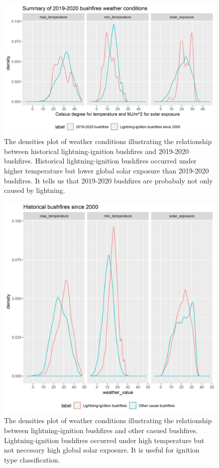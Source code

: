 \documentclass{monashthesis}
\begin{document}
\begin{figure}
\centering
\includegraphics[width=5.20833in]{figures/history_weather_condition.jpg}
\caption{The densities plot of weather conditions illustrating the
relationship between historical lightning-ignition bushfires and
2019-2020 bushfires. Historical lightning-ignition bushfires occurred
under higher temperature but lower global solar exposure than 2019-2020
bushfires. It tells us that 2019-2020 bushfires are probabaly not only
caused by lightning.}
\end{figure}

\begin{figure}
\centering
\includegraphics[width=5.20833in]{figures/his_lightning.jpg}
\caption{The densities plot of weather conditions illustrating the
relationship between lightning-ignition bushfires and other casued
bushfires. Lightning-ignition bushfires occurred under high temperature
but not neccssary high global solar exposure. It is useful for ignition
type classification.}
\end{figure}
\end{document}
